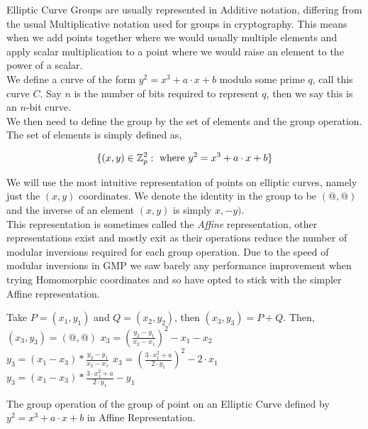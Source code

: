 \documentclass[ %
                    author={Nicholas Tutte},
                supervisor={Prof. Nigel Smart},
                    degree={MEng},
                     title={Secure Two Party Computation},
                  subtitle={A practical comparison of recent protocols},
                      type={Research - GG1K},
                      year={2015} ]{dissertation}
\begin{document}
			Elliptic Curve Groups are usually represented in Additive notation, differing from the usual Multiplicative notation used for groups in cryptography. This means when we add points together where we would usually multiple elements and apply scalar multiplication to a point where we would raise an element to the power of a scalar.\\

			We define a curve of the form $y^2 = x^3 + a\cdot x + b$ modulo some prime $q$, call this curve $C$. Say $n$ is the number of bits required to represent $q$, then we say this is an $n$-bit curve.\\

			We then need to define the group by the set of elements and the group operation. The set of elements is simply defined as,

			$$\{(x, y) \in \mathbb{Z}_p^2 : \textnormal{ where } y^2 = x^3 + a\cdot x + b\} $$

			We will use the most intuitive representation of points on elliptic curves, namely just the $(x, y)$ coordinates. We denote the identity in the group to be $(@, @)$ and the inverse of an element $(x, y)$ is simply $x, -y)$.\\

			This representation is sometimes called the \emph{Affine} representation, other representations exist and mostly exit as their operations reduce the number of modular inversions required for each group operation. Due to the speed of modular inversions in GMP we saw barely any performance improvement when trying Homomorphic coordinates and so have opted to stick with the simpler Affine representation.\\


			\begin{mdframed}
				\begin{algorithm}[H]
					Take $P = (x_1, y_1)$ and $Q = (x_2, y_2)$, then $(x_3, y_3) = P + Q$. Then,\\[0.15cm]
					{
						$(x_3, y_3) = (@, @)$
					}
					{
						{
							$x_3 = (\frac{y_2 - y_1}{x_2 - x_1})^2 - x_1 - x_2$\\
							$y_3 = (x_1 - x_3) * \frac{y_2 - y_1}{x_2 - x_1}$
						}
						{
							$x_3 = (\frac{3\cdot x_1^2 + a}{2 \cdot y_1}) ^ 2 - 2\cdot x_1$\\
							$y_3 = (x_1 - x_3) * \frac{3 \cdot x_1^2 + a}{2 \cdot y_1} - y_1$
						}
					}

					\caption{The group operation of the group of point on an Elliptic Curve defined by $y^2 = x^3 + a \cdot x + b$ in Affine Representation. \label{Algo:ECC_GroupOp}}
				\end{algorithm}
			\end{mdframed}
\end{document}
